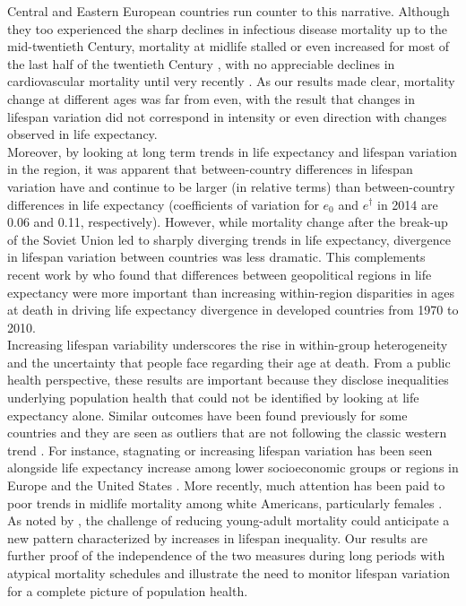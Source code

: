 \documentclass{article}
\begin{document}
\begin{spacing}{1.5}
Central and Eastern European countries run counter to this narrative. Although they too experienced the sharp declines in infectious disease mortality up to the mid-twentieth Century, mortality at midlife stalled or even increased for most of the last half of the twentieth Century \citep{mckee2001}, with no appreciable declines in cardiovascular mortality until very recently \citep{caselli2002epidemiologic, grigoriev2014recent,mesle2004mortality}.  As our results made clear, mortality change at different ages was far from even, with the result that changes in lifespan variation did not correspond in intensity or even direction with changes observed in life expectancy.\\

Moreover, by looking at long term trends in life expectancy and lifespan variation in the region, it was apparent that between-country differences in lifespan variation have and continue to be larger (in relative terms) than between-country differences in life expectancy (coefficients of variation for $e_0$ and $e^\dagger$ in 2014 are 0.06 and 0.11, respectively). However, while mortality change after the break-up of the Soviet Union led to sharply diverging trends in life expectancy, divergence in lifespan variation between countries was less dramatic. This complements recent work by \citet{timonin2016disparities} who found that differences between geopolitical regions in life expectancy were more important than increasing within-region disparities in ages at death in driving life expectancy divergence in developed countries from 1970 to 2010.\\

Increasing lifespan variability underscores the rise in within-group heterogeneity and the uncertainty that people face regarding their age at death.  From a public health perspective, these results are important because they disclose inequalities underlying population health that could not be identified by looking at life expectancy alone. Similar outcomes have been found previously for some countries and they are seen as outliers that are not following the classic western trend \citep{wilmoth1999,zhang2009}. For instance, stagnating or increasing lifespan variation has been seen alongside life expectancy increase among lower socioeconomic groups or regions in Europe \citep{vanraalte2014,bronnum-hansen2017,seaman2016increasing} and the United States \citep{sasson2016trends}. More recently, much attention has been paid to poor trends in midlife mortality among white Americans, particularly females \citep{case2015rising,montez2013trends}. As noted by \citet{gillespie2014divergence}, the challenge of reducing young-adult mortality could anticipate a new pattern characterized by increases in lifespan inequality. Our results are further proof of the independence of the two measures during long periods with atypical mortality schedules and illustrate the need to monitor lifespan variation for a complete picture of population health.\\


\end{spacing}
\end{document}
